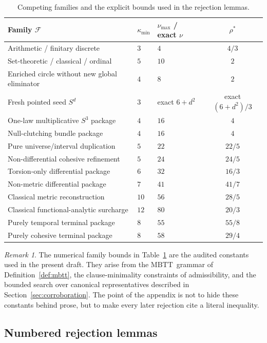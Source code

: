 \documentclass{lmcs}
\theoremstyle{plain}
\theoremstyle{definition}
\theoremstyle{remark}
\newtheorem{rem}[thm]{Remark}
\newcommand{\MBTT}{\ensuremath{\mathrm{MBTT}}}
\begin{document}
\begin{table}[tbp]
\centering
\caption{Competing families and the explicit bounds used in the rejection lemmas.}
\label{tab:appendix-families}
\small
\begin{tabular}{@{}lllc@{}}
\toprule
Family $\mathcal F$ & $\kappa_{\min}$ & $\nu_{\max}$ / exact $\nu$ & $\rho^\ast$ \\
\midrule
Arithmetic / finitary discrete & $3$ & $4$ & $4/3$ \\
Set-theoretic / classical / ordinal & $5$ & $10$ & $2$ \\
Enriched circle without new global eliminator & $4$ & $8$ & $2$ \\
Fresh pointed seed $S^d$ & $3$ & exact $6+d^2$ & exact $(6+d^2)/3$ \\
One-law multiplicative $S^3$ package & $4$ & $16$ & $4$ \\
Null-clutching bundle package & $4$ & $16$ & $4$ \\
Pure universe/interval duplication & $5$ & $22$ & $22/5$ \\
Non-differential cohesive refinement & $5$ & $24$ & $24/5$ \\
Torsion-only differential package & $6$ & $32$ & $16/3$ \\
Non-metric differential package & $7$ & $41$ & $41/7$ \\
Classical metric reconstruction & $10$ & $56$ & $28/5$ \\
Classical functional-analytic surcharge & $12$ & $80$ & $20/3$ \\
Purely temporal terminal package & $8$ & $55$ & $55/8$ \\
Purely cohesive terminal package & $8$ & $58$ & $29/4$ \\
\bottomrule
\end{tabular}
\end{table}

\begin{rem}
The numerical family bounds in Table~\ref{tab:appendix-families} are the audited constants used in the present draft.
They arise from the \MBTT\ grammar of Definition~\ref{def:mbtt}, the clause-minimality constraints of admissibility, and the bounded search over canonical representatives described in Section~\ref{sec:corroboration}.
The point of the appendix is not to hide these constants behind prose, but to make every later rejection cite a literal inequality.
\end{rem}

\subsection{Numbered rejection lemmas}
\end{document}
